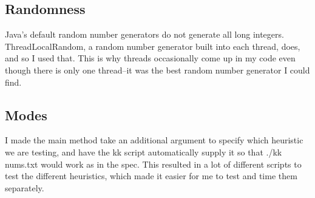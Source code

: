 \documentclass{article}
\begin{document}
\subsection*{Randomness}
Java's default random number generators do not generate all long integers. ThreadLocalRandom, a random number generator built into each thread, does, and so I used that. This is why threads occasionally come up in my code even though there is only one thread--it was the best random number generator I could find. 
\subsection*{Modes}
I made the main method take an additional argument to specify which heuristic we are testing, and have the kk script automatically supply it so that ./kk nums.txt would work as in the spec. This resulted in a lot of different scripts to test the different heuristics, which made it easier for me to test and time them separately.  
\end{document}
